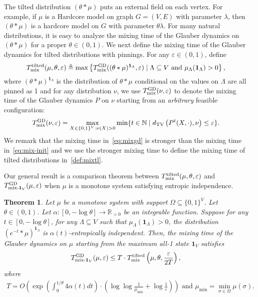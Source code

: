 \documentclass[11pt,a4paper]{article}
\newcommand{\DTV}[2]{d_{\mathrm{TV}}\left({#1},{#2}\right)}
\renewcommand{\epsilon}{\varepsilon}
\newcommand{\mixtl}{T_{\textnormal{mix}}^{\textnormal{tilted}}}
\newcommand{\mixmax}{T_{\textnormal{mix-}\*1_V}^{\textnormal{GD}}}
\newcommand{\mixgd}{T_{\textnormal{mix}}^{\textnormal{GD}}}
\newtheorem{theorem}{Theorem}[section]
\theoremstyle{definition}
\newcommand{\tuple}[1]{\left(#1\right)} \newcommand{\eps}{\varepsilon}
\newcommand{\tp}{\tuple}
\newcommand{\defeq}{\triangleq}
\def\*#1{\mathbf{#1}} %
\begin{document}
The tilted distribution $(\theta * \mu)$ puts an external field on each vertex. For example, if $\mu$ is a Hardcore model on graph $G=(V,E)$ with parameter $\lambda$, then $(\theta * \mu)$ is a hardcore model on $G$ with parameter $\theta \lambda$.
For many natural distributions, it is easy to analyze the mixing time of the Glauber dynamics on $(\theta * \mu)$ for a proper $\theta \in (0,1)$. 
We next define the mixing time of the Glauber dynamics for tilted distributions with pinnings. For any $\epsilon \in (0,1)$, define
\begin{align}\label{def:mixtl}
   \mixtl(\mu,\theta,\epsilon) \defeq \max\left\{\mixgd((\theta * \mu)^{\*1_{\Lambda}},\epsilon) \mid \Lambda \subseteq V \text{ and } \mu_\Lambda(\*1_\Lambda) > 0\right\},
\end{align}
where $(\theta * \mu)^{\*1_{\Lambda}}$ is the distribution of $\theta * \mu$ conditional on the values on $\Lambda$ are all pinned as 1 and for any distribution $\nu$, we use $\mixgd(\nu,\epsilon)$ to denote the mixing time of the Glauber dynamics $P$ on $\nu$ starting from an \emph{arbitrary} feasible configuration:
\begin{align}
    \mixgd(\nu,\epsilon) = \max_{X \in \{0,1\}^V: \nu(X) > 0} \min\{t \in \mathbb{N} \mid \DTV{P^t(X,\cdot)}{\nu}\leq \epsilon\}.\label{eq:mixgd}
\end{align}
We remark that the mixing time in~\eqref{eq:mixgd} is stronger than the mixing time in~\eqref{eq:mix-init} and we use the stronger mixing time to define the mixing time of tilted distributions in~\eqref{def:mixtl}. 

Our general result is a comparison theorem between $\mixtl(\mu,\theta,\epsilon)$ and $\mixmax(\mu,\epsilon)$ when $\mu$ is a monotone system satisfying entropic independence.

\begin{theorem}\label{thm:main-comparison}
Let $\mu$ be a monotone system with support $\Omega \subseteq \{0,1\}^V$. Let $\theta \in (0,1)$. Let $\alpha:[0,-\log \theta] \to \mathbb{R}_{> 0}$ be an integrable function.
Suppose for any $t \in [0,-\log \theta]$, for any $\Lambda \subseteq V$ such that $\mu_{\Lambda}(\*1_\Lambda) > 0$, the distribution $(e^{-t} * \mu)^{\*1_\Lambda}$ is $\alpha(t)$-entropically independent.
Then, the mixing time of the Glauber dynamics on $\mu$ starting from the maximum all-1 state $\*1_V$ satisfies 
\begin{align*}
    \mixmax(\mu,\epsilon) \leq T \cdot \mixtl\tp{\mu,\theta,\frac{\epsilon}{2T}},
\end{align*}
where
\begin{align*}
    T = O\tp{\exp \tp{\int_{0}^{1/\theta}4\alpha(t)dt } \cdot \tp{\log \log \frac{1}{\mu_{\min}} + \log \frac{1}{\epsilon}}} \text{ and } \mu_{\min} = \min_{\sigma \in \Omega} \mu(\sigma).
\end{align*}
\end{theorem}
\end{document}
